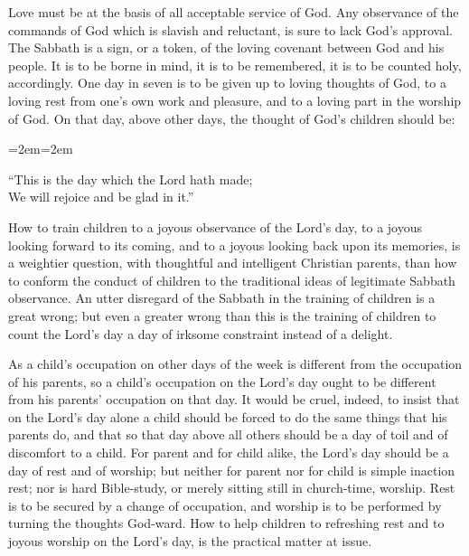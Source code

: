 \documentclass[
]{book}
\newenvironment{poetry}[0]{\par\leftskip=2em\rightskip=2em}{\par\medskip}
\begin{document}
Love must be at the basis of all acceptable service of God. Any observance of the commands of God which is slavish and reluctant, is sure to lack God's approval. The Sabbath is a sign, or a token, of the loving covenant between God and his people. It is to be borne in mind, it is to be remembered, it is to be counted holy, accordingly. One day in seven is to be given up to loving thoughts of God, to a loving rest from one's own work and pleasure, and to a loving part in the worship of God. On that day, above other days, the thought of God's children should be:

\begin{poetry}

``This is the day which the Lord hath made;\\
We will rejoice and be glad in it.''

\end{poetry}

How to train children to a joyous observance of the Lord's day, to a joyous looking forward to its coming, and to a joyous looking back upon its memories, is a weightier question, with thoughtful and intelligent Christian parents, than how to conform the conduct of children to the traditional ideas of legitimate Sabbath observance. An utter disregard of the Sabbath in the training of children is a great wrong; but even a greater wrong than this is the training of children to count the Lord's day a day of irksome constraint instead of a delight.

As a child's occupation on other days of the week is different from the occupation of his parents, so a child's occupation on the Lord's day ought to be different from his parents' occupation on that day. It would be cruel, indeed, to insist that on the Lord's day alone a child should be forced to do the same things that his parents do, and that so that day above all others should be a day of toil and of discomfort to a child. For parent and for child alike, the Lord's day should be a day of rest and of worship; but neither for parent nor for child is simple inaction rest; nor is hard Bible-study, or merely sitting still in church-time, worship. Rest is to be secured by a change of occupation, and worship is to be performed by turning the thoughts God-ward. How to help children to refreshing rest and to joyous worship on the Lord's day, is the practical matter at issue.
\end{document}
